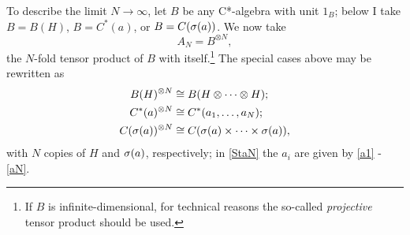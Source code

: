 \documentclass[12pt]{article}
\numberwithin{equation}{section}
\newcommand{\er}{\eqref}
\newcommand{\beq}{\begin{equation}}
\newcommand{\eeq}{\end{equation}}
\newcommand{\raw}{\rightarrow}
\newcommand{\ot}{\otimes}
\newcommand{\x}{\times}
\begin{document}
 To describe the limit $N\raw\infty$, let $B$ be any C*-algebra with unit $1_B$;  below I take $B=B(H)$, $B=C^*(a)$,  or $B=C(\sigma(a))$. 
 We now take
 \beq
 A_N=B^{\ot N},
 \eeq
  the $N$-fold tensor product 
  of $B$ with itself.\footnote{If $B$ is infinite-dimensional, for technical reasons  the so-called \emph{projective} tensor product should be used.} The  special cases above may  be rewritten as
\begin{align}
B(H)^{\ot N}&\cong  B(H\ot \cdots \ot H);\label{BHN}\\
C^*(a)^{\ot N}&\cong C^*(a_1, \ldots, a_N);\label{StaN} \\
C(\sg(a))^{\ot N}&\cong  C(\sg(a) \x\cdots\x\sg(a)), \label{sgN}
\end{align}
 with $N$ copies of $H$ and $\sigma(a)$, respectively; in \er{StaN} the $a_i$ are given by \er{a1} - \er{aN}.
 
\end{document}
